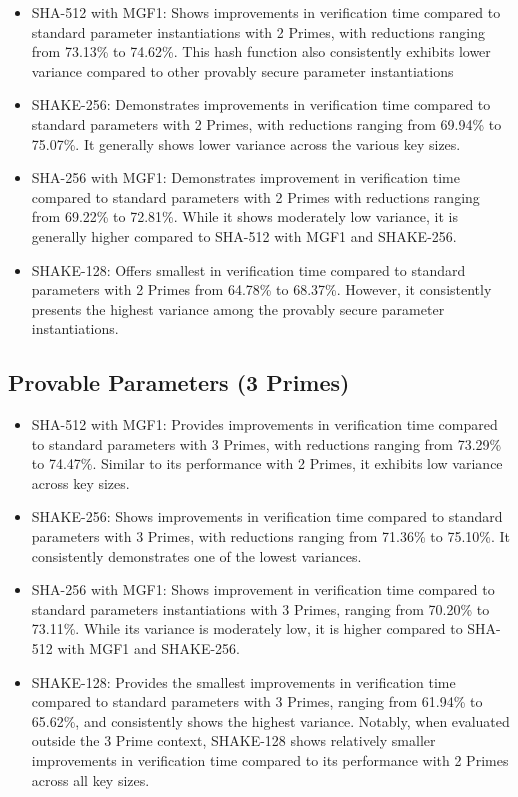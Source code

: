 \documentclass[]{final_report}
\theoremstyle{definition}
\begin{document}
\begin{itemize}
\item SHA-512 with MGF1: Shows improvements in verification time compared to standard parameter instantiations with 2 Primes, with reductions ranging from 73.13\% to 74.62\%. This hash function also consistently exhibits lower variance compared to other provably secure parameter instantiations
\item SHAKE-256: Demonstrates improvements in verification time compared to standard parameters with 2 Primes, with reductions ranging from 69.94\% to 75.07\%. It generally shows lower variance across the various key sizes.
\item SHA-256 with MGF1: Demonstrates improvement in verification time compared to standard parameters with 2 Primes with reductions ranging from 69.22\% to 72.81\%. While it shows moderately low variance, it is generally higher compared to SHA-512 with MGF1 and SHAKE-256.
\item SHAKE-128: Offers smallest in verification time compared to standard parameters with 2 Primes from 64.78\% to 68.37\%. However, it consistently presents the highest variance among the provably secure parameter instantiations.
\end{itemize}

\subsection*{Provable Parameters (3 Primes)}
\begin{itemize}
\item SHA-512 with MGF1: Provides improvements in verification time compared to standard parameters with 3 Primes, with reductions ranging from 73.29\% to 74.47\%. Similar to its performance with 2 Primes, it exhibits low variance across key sizes.
\item SHAKE-256: Shows improvements in verification time compared to standard parameters with 3 Primes, with reductions ranging from 71.36\% to 75.10\%. It consistently demonstrates one of the lowest variances.
\item SHA-256 with MGF1: Shows improvement in verification time compared to standard parameters instantiations with 3 Primes, ranging from 70.20\% to 73.11\%. While its variance is moderately low, it is higher compared to SHA-512 with MGF1 and SHAKE-256.
\item SHAKE-128: Provides the smallest improvements in verification time compared to standard parameters with 3 Primes, ranging from 61.94\% to 65.62\%, and consistently shows the highest variance. Notably, when evaluated outside the 3 Prime context, SHAKE-128 shows relatively smaller improvements in verification time compared to its performance with 2 Primes across all key sizes. 
\end{itemize}
\end{document}

